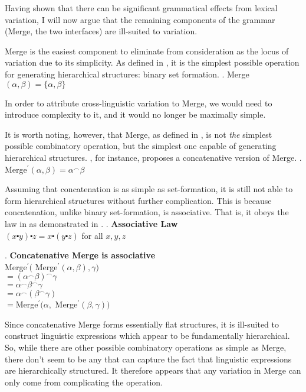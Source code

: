 \documentclass[MilwayThesis]{subfiles}
\begin{document}
Having shown that there can be significant grammatical effects from lexical variation, I will now argue that the remaining components of the grammar (Merge, the two interfaces) are ill-suited to variation.

Merge is the easiest component to eliminate from consideration as the locus of variation due to its simplicity.
As defined in \Next, it is the simplest possible operation for generating hierarchical structures: binary set formation.
\ex. Merge$(\alpha, \beta) = \{ \alpha, \beta\}$

In order to attribute cross-linguistic variation to Merge, we would need to introduce complexity to it, and it would no longer be maximally simple.

It is worth noting, however, that Merge, as defined in \Last, is not \textit{the} simplest possible combinatory operation, but the simplest one capable of generating hierarchical structures.
\textcite{hornstein2009theory}, for instance, proposes a concatenative version of Merge.
\ex. Merge$^\prime(\alpha, \beta) = \alpha^\frown\beta$

Assuming that concatenation is as simple as set-formation, it is still not able to form hierarchical structures without further complication.
This is because concatenation, unlike binary set-formation, is associative.
That is, it obeys the law in \Next as demonstrated in \NNext.
\ex. \textbf{Associative Law}\\
$(x \centerdot y) \centerdot z = x \centerdot (y \centerdot z)$ for all $x,y,z$

\ex. \textbf{Concatenative Merge is associative}\\
Merge$^\prime($ Merge$^\prime(\alpha, \beta), \gamma)$\\
$= (\alpha^\frown\beta)^\frown\gamma$\\
$= \alpha^\frown\beta^\frown\gamma$\\
$= \alpha^\frown(\beta^\frown\gamma)$\\
$= $Merge$^\prime(\alpha, $ Merge$^\prime(\beta, \gamma))$

Since concatenative Merge forms essentially flat structures, it is ill-suited to construct linguistic expressions which appear to be fundamentally hierarchical.
So, while there are other possible combinatory operations as simple as Merge, there don't seem to be any that can capture the fact that linguistic expressions are hierarchically structured.
It therefore appears that any variation in Merge can only come from complicating the operation.
\end{document}
